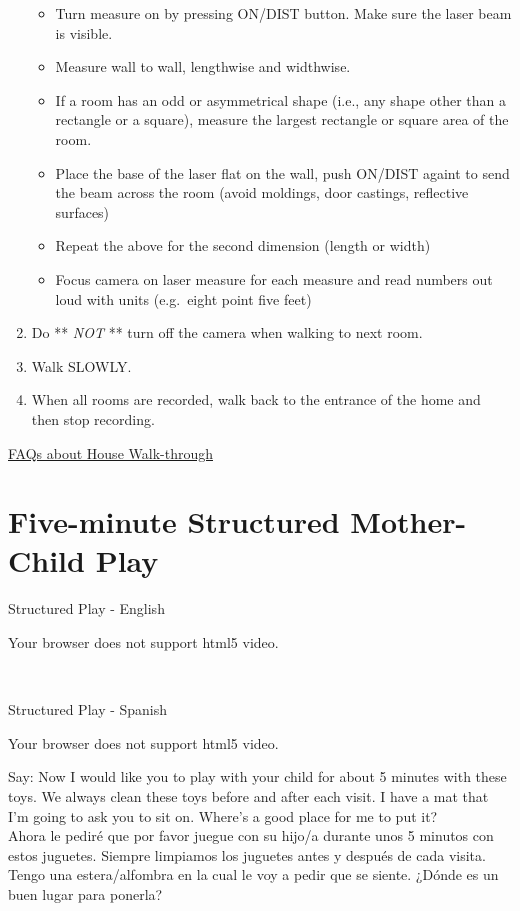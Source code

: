 \documentclass[
  12pt,
]{book}
\providecommand{\tightlist}{%
  \setlength{\itemsep}{0pt}\setlength{\parskip}{0pt}}
\begin{document}
\begin{enumerate}
  \begin{itemize}
  \tightlist
  \item
    Turn measure on by pressing ON/DIST button. Make sure the laser beam is visible.
  \item
    Measure wall to wall, lengthwise and widthwise.
  \item
    If a room has an odd or asymmetrical shape (i.e., any shape other than a rectangle or a square), measure the largest rectangle or square area of the room.
  \item
    Place the base of the laser flat on the wall, push ON/DIST againt to send the beam across the room (avoid moldings, door castings, reflective surfaces)
  \item
    Repeat the above for the second dimension (length or width)
  \item
    Focus camera on laser measure for each measure and read numbers out loud with units (e.g.~eight point five feet)
  \end{itemize}
\item
  Do ** \emph{NOT} ** turn off the camera when walking to next room.
\item
  Walk SLOWLY.
\item
  When all rooms are recorded, walk back to the entrance of the home and then stop recording.
\end{enumerate}

\protect\hyperlink{faqs_walkthrough}{FAQs about House Walk-through}

\hypertarget{five-minute-structured-mother-child-play}{%
\section{Five-minute Structured Mother-Child Play}\label{five-minute-structured-mother-child-play}}

Structured Play - English

Your browser does not support html5 video.

 

Structured Play - Spanish

Your browser does not support html5 video.

Say: Now I would like you to play with your child for about 5 minutes with these toys. We always clean these toys before and after each visit. I have a mat that I'm going to ask you to sit on. Where's a good place for me to put it?
    Ahora le pediré que por favor juegue con su hijo/a durante unos 5 minutos con estos juguetes. Siempre limpiamos los juguetes antes y después de cada visita. Tengo una estera/alfombra en la cual le voy a pedir que se siente. ¿Dónde es un buen lugar para ponerla?
\end{document}
